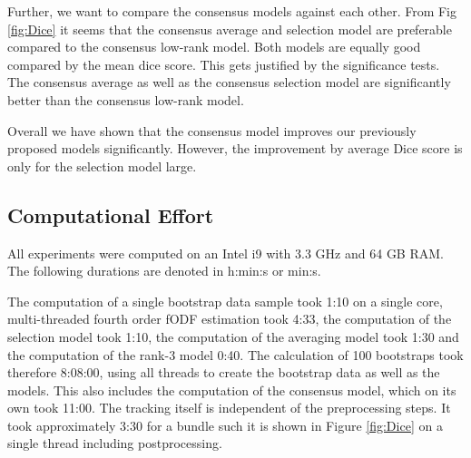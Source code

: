 Further, we want to compare the consensus models against each other. From Fig
\ref{fig:Dice} it seems that the consensus average and selection model are
preferable compared to the consensus low-rank model. Both models are equally
good compared by the mean dice score. This gets justified by the significance
tests. The consensus average as well as the consensus selection model are
significantly better than the consensus low-rank model. 

Overall we have shown that the consensus model improves our previously proposed
models significantly. However, the improvement by average Dice score is only for
the selection model large. 
\subsection{Computational Effort}
All experiments were computed on an Intel i9 with 3.3 GHz and 64 GB RAM. The
following durations are denoted in h:min:s or min:s.

The computation of a single bootstrap data sample took 1:10 on a single core,
multi-threaded fourth order fODF estimation took 4:33, the computation of the
selection model took 1:10, the computation of the averaging model took 1:30 and
the computation of the rank-3 model 0:40. The calculation of 100 bootstraps took
therefore 8:08:00, using all threads to create the bootstrap data as well as the
models. This also includes the computation of the consensus model, which on its
own took 11:00. The tracking itself is independent of the preprocessing steps.
It took approximately 3:30 for a bundle such it is shown in Figure
\ref{fig:Dice} on a single thread including postprocessing.  


